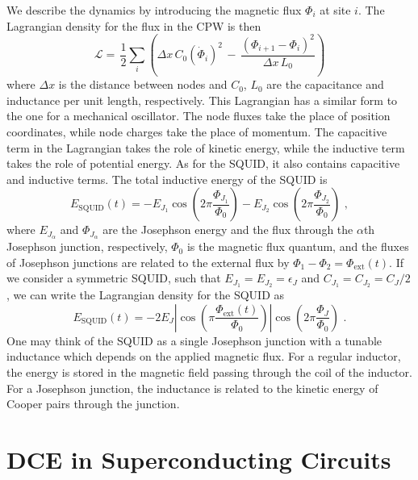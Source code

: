 We describe the dynamics by introducing the magnetic flux $\Phi_i$ at site $i$. The Lagrangian density for the flux in the CPW is then
%
\begin{equation}\label{eq:CPW_lagrangian}
\mathcal{L} = \, \frac{1}{2} \sum_i \left( \Delta x \, C_{0} \left(\dot{\Phi}_{i}\right)^{2} \, - \, 
\frac{\left(\Phi_{i+1}-\Phi_{i}\right)^{2}}{\Delta x \, L_{0}} \right)
\end{equation}
%
where $\Delta x$ is the distance between nodes and $C_0$, $L_0$ are the capacitance and inductance per unit length, respectively. This Lagrangian has a similar form to the one for a mechanical oscillator. The node fluxes take the place of position coordinates, while node charges take the place of momentum. The capacitive term in the Lagrangian takes the role of kinetic energy, while the inductive term takes the role of potential energy.
As for the SQUID, it also contains capacitive and inductive terms. The total inductive energy of the SQUID is
%
\begin{equation}\label{eq:squid_energy_assym}
    E_{\text{SQUID}}(t) = - E_{J_1} \cos{\left(2\pi
    \frac{\Phi_{J_1}}{\Phi_0}\right)} - E_{J_2} \cos{\left(2\pi
    \frac{\Phi_{J_2}}{\Phi_0}\right)} \, \, ,
\end{equation}
%
where $E_{J_\alpha}$ and $\Phi_{J_\alpha}$ are the Josephson energy and the flux through the $\alpha$th Josephson junction, 
respectively, $\Phi_0$ is the magnetic flux quantum, and the fluxes of Josephson junctions are related to the external flux
by $\Phi_1 - \Phi_2  = \Phi_{\text{ext}}(t)$. If we consider a symmetric SQUID, such that $E_{J_1} = E_{J_2} = \epsilon_J$ and
$C_{J_1} = C_{J_2} = C_J/2$, we can write the Lagrangian density for the SQUID as
%
\begin{equation}\label{eq:squid_energy_symm}
    E_{\text{SQUID}}(t) = -2E_J \left|\cos\left(\pi\frac{\Phi_{\text{ext}}(t)}{\Phi_0}\right)\right|
    \cos\left(2\pi \frac{\Phi_J}{\Phi_0} \right) \, \, .
\end{equation}
%
One may think of the SQUID as a single Josephson junction with a tunable inductance which depends on the applied magnetic flux. For a regular inductor, the energy is stored in the magnetic field passing through the coil of the inductor. For a Josephson junction, the inductance is related to the kinetic energy of Cooper pairs through the junction.


\section{DCE in Superconducting Circuits}\label{sec:DCE_in_SC}

